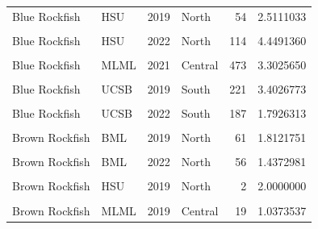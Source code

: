 \documentclass[
]{article}
\begin{document}
\begin{longtable}[t]{llrlrr}
Blue Rockfish & HSU & 2019 & North & 54 & 2.5111033\\
\addlinespace
\cellcolor{gray!6}{Blue Rockfish} & \cellcolor{gray!6}{HSU} & \cellcolor{gray!6}{2021} & \cellcolor{gray!6}{North} & \cellcolor{gray!6}{114} & \cellcolor{gray!6}{6.3118302}\\
Blue Rockfish & HSU & 2022 & North & 114 & 4.4491360\\
\cellcolor{gray!6}{Blue Rockfish} & \cellcolor{gray!6}{MLML} & \cellcolor{gray!6}{2019} & \cellcolor{gray!6}{Central} & \cellcolor{gray!6}{1429} & \cellcolor{gray!6}{7.9574113}\\
Blue Rockfish & MLML & 2021 & Central & 473 & 3.3025650\\
\cellcolor{gray!6}{Blue Rockfish} & \cellcolor{gray!6}{MLML} & \cellcolor{gray!6}{2022} & \cellcolor{gray!6}{Central} & \cellcolor{gray!6}{368} & \cellcolor{gray!6}{2.3472667}\\
\addlinespace
Blue Rockfish & UCSB & 2019 & South & 221 & 3.4026773\\
\cellcolor{gray!6}{Blue Rockfish} & \cellcolor{gray!6}{UCSB} & \cellcolor{gray!6}{2021} & \cellcolor{gray!6}{South} & \cellcolor{gray!6}{222} & \cellcolor{gray!6}{2.8199352}\\
Blue Rockfish & UCSB & 2022 & South & 187 & 1.7926313\\
\cellcolor{gray!6}{Bocaccio} & \cellcolor{gray!6}{MLML} & \cellcolor{gray!6}{2022} & \cellcolor{gray!6}{Central} & \cellcolor{gray!6}{2} & \cellcolor{gray!6}{0.3493891}\\
Brown Rockfish & BML & 2019 & North & 61 & 1.8121751\\
\addlinespace
\cellcolor{gray!6}{Brown Rockfish} & \cellcolor{gray!6}{BML} & \cellcolor{gray!6}{2021} & \cellcolor{gray!6}{North} & \cellcolor{gray!6}{56} & \cellcolor{gray!6}{1.4569106}\\
Brown Rockfish & BML & 2022 & North & 56 & 1.4372981\\
\cellcolor{gray!6}{Brown Rockfish} & \cellcolor{gray!6}{Cal Poly} & \cellcolor{gray!6}{2019} & \cellcolor{gray!6}{Central} & \cellcolor{gray!6}{2} & \cellcolor{gray!6}{0.6645613}\\
Brown Rockfish & HSU & 2019 & North & 2 & 2.0000000\\
\cellcolor{gray!6}{Brown Rockfish} & \cellcolor{gray!6}{HSU} & \cellcolor{gray!6}{2022} & \cellcolor{gray!6}{North} & \cellcolor{gray!6}{1} & \cellcolor{gray!6}{0.7500000}\\
\addlinespace
Brown Rockfish & MLML & 2019 & Central & 19 & 1.0373537\\

\end{longtable}
\end{document}
